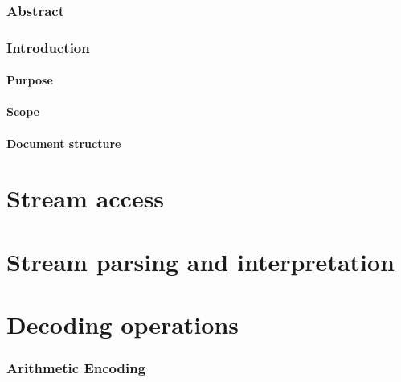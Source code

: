

\section{Abstract}
\section{Introduction}
\subsection{Purpose}
\subsection{Scope}
\subsection{Document structure}

\clearpage
\part{Stream access}
\clearpage
\part{Stream parsing and interpretation}
\clearpage
\part{Decoding operations}



\appendix
\section{Arithmetic Encoding}
